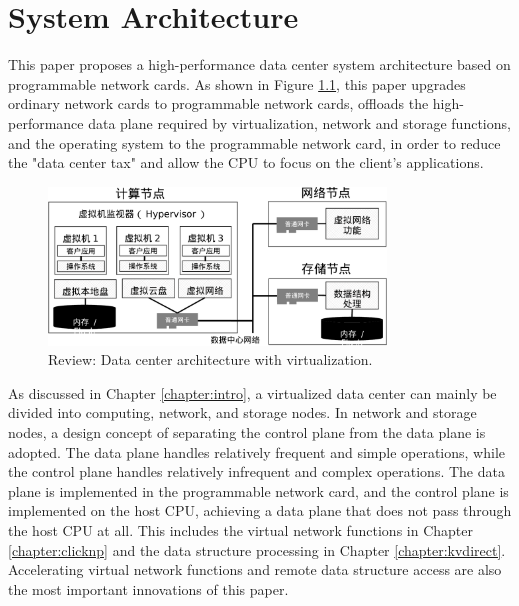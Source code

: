 \chapter{System Architecture}

This paper proposes a high-performance data center system architecture based on programmable network cards. As shown in Figure \ref{arch:fig:virt-architecture}, this paper upgrades ordinary network cards to programmable network cards, offloads the high-performance data plane required by virtualization, network and storage functions, and the operating system to the programmable network card, in order to reduce the "data center tax" and allow the CPU to focus on the client's applications.

\begin{figure}[htbp]
	\centering
	\includegraphics[width=0.8\textwidth]{figures/virt_arch.pdf}
	\caption{Review: Data center architecture with virtualization.}
	\label{arch:fig:virt-architecture}
\end{figure}

As discussed in Chapter \ref{chapter:intro}, a virtualized data center can mainly be divided into computing, network, and storage nodes. In network and storage nodes, a design concept of separating the control plane from the data plane is adopted. The data plane handles relatively frequent and simple operations, while the control plane handles relatively infrequent and complex operations. The data plane is implemented in the programmable network card, and the control plane is implemented on the host CPU, achieving a data plane that does not pass through the host CPU at all. This includes the virtual network functions in Chapter \ref{chapter:clicknp} and the data structure processing in Chapter \ref{chapter:kvdirect}. Accelerating virtual network functions and remote data structure access are also the most important innovations of this paper.

